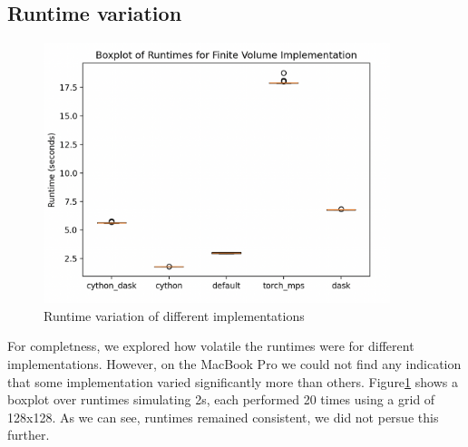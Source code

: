 \documentclass[a4paper,10pt]{article}
\begin{document}
\subsection{Runtime variation}
\begin{figure}[H]
  \centering
  \includegraphics[width=0.9\textwidth]{images/misc/boxplot_128grid_2sec}
  \caption{Runtime variation of different implementations}
  \label{fig:runtime_boxplot}
\end{figure}
For completness, we explored how volatile the runtimes were for different implementations.
However, on the MacBook Pro we could not find any indication that some implementation varied significantly more than others.
Figure\ref{fig:runtime_boxplot} shows a boxplot over runtimes simulating 2s, each performed 20 times using a grid of 128x128.
As we can see, runtimes remained consistent, we did not persue this further.


\end{document}
